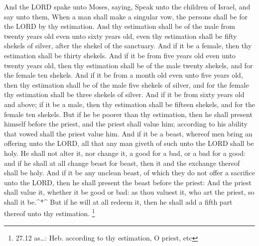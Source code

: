  And the LORD spake unto Moses, saying,  Speak
unto the children of Israel, and say unto them, When a man shall make a
singular vow, the persons shall be for the LORD by thy estimation.
 And thy estimation shall be of the male from twenty years
old even unto sixty years old, even thy estimation shall be fifty
shekels of silver, after the shekel of the sanctuary.  And
if it be a female, then thy estimation shall be thirty shekels.
 And if it be from five years old even unto twenty years
old, then thy estimation shall be of the male twenty shekels, and for
the female ten shekels.  And if it be from a month old even
unto five years old, then thy estimation shall be of the male five
shekels of silver, and for the female thy estimation shall be three
shekels of silver.  And if it be from sixty years old and
above; if it be a male, then thy estimation shall be fifteen shekels,
and for the female ten shekels.  But if he be poorer than
thy estimation, then he shall present himself before the priest, and the
priest shall value him; according to his ability that vowed shall the
priest value him.  And if it be a beast, whereof men bring
an offering unto the LORD, all that any man giveth of such unto the LORD
shall be holy.  He shall not alter it, nor change it, a
good for a bad, or a bad for a good: and if he shall at all change beast
for beast, then it and the exchange thereof shall be holy. 
And if it be any unclean beast, of which they do not offer a sacrifice
unto the LORD, then he shall present the beast before the priest:
 And the priest shall value it, whether it be good or bad:
as thou valuest it, who art the priest, so shall it be.\^{}*\^{}
 But if he will at all redeem it, then he shall add a fifth
part thereof unto thy estimation. \footnote{27.12 as\ldots: Heb.
  according to thy estimation, O priest, etc}

